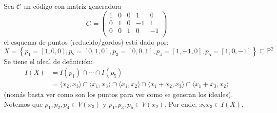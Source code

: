 \documentclass[12pt]{report}
\newcounter{it}
\theoremstyle{largebreak}
\begin{document}
    \begin{exa}
        Sea $\mathcal{C}$ un código con matriz generadora
        \begin{equation*}
            G=\left( 
                \begin{array}{ccccc}
                    1 & 0 & 0 & 1 & 0 \\
                    0 & 1 & 0 & -1 & 1 \\
                    0 & 0 & 1 & 0 & -1 \\
                \end{array}
            \right)
        \end{equation*}
        el esquema de puntos (reducido/gordos) está dado por:
        \begin{equation*}
            X=\left\{p_1=[1,0,0],p_2=[0,1,0],p_3=[0,0,1],p_4=[1,-1,0],p_5=[1,0,-1] \right\}\subseteq\mathbb{P}^2
        \end{equation*}
        Se tiene el ideal de definición:
        \begin{equation*}
            \begin{split}
                I(X)&=I(p_1)\cap\cdots\cap I(p_5)\\
                &=\langle x_2,x_3 \rangle\cap\langle x_1,x_3 \rangle\cap\langle x_1,x_2 \rangle\cap\langle x_1+x_2,x_3 \rangle\cap\langle x_1+x_3,x_2 \rangle
            \end{split}
        \end{equation*}
        (nomás basta ver como son los puntos para ver como se generan los ideales). Notemos que $p_1,p_2,p_4\in V(x_3)$ y $p_1,p_3,p_5\in V(x_2)$. Por ende, $x_2x_3\in I(X)$.


\end{exa}
\end{document}
